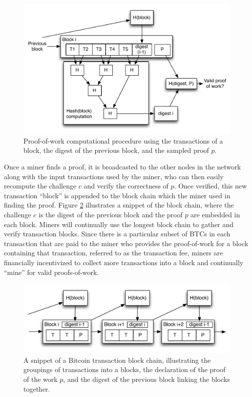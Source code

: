 \begin{center}
\begin{figure}
\includegraphics[scale=0.5]{./images/transaction_pow.pdf}
\caption{Proof-of-work computational procedure using the transactions of a block, the digest of the previous block, and the sampled proof $p$.}
\label{fig:pow}
\end{figure}
\end{center}

Once a miner finds a proof, it is broadcasted to the other nodes in the network along with the input transactions used by the miner, who can then easily recompute the challenge $c$ and verify the correctness of $p$. Once verified, this new transaction ``block'' is appended to the block chain which the miner used in finding the proof. Figure \ref{fig:block} illustrates a snippet of the block chain, where the challenge $c$ is the digest of the previous block and the proof $p$ are embedded in each block. Miners will continually use the longest block chain to gather and verify transaction blocks. Since there is a particular subset of BTCs in each transaction that are paid to the miner who provides the proof-of-work for a block containing that transaction, referred to as the transaction fee, miners are financially incentivized to collect more transactions into a block and continually ``mine'' for valid proofs-of-work. 

\begin{center}
\begin{figure}
\includegraphics[scale=0.5]{./images/transaction_block_pow.pdf}
\caption{A snippet of a Bitcoin transaction block chain, illustrating the groupings of transactions into a blocks, the declaration of the proof of the work $p$, and the digest of the previous block linking the blocks together.}
\label{fig:block}
\end{figure}
\end{center}


